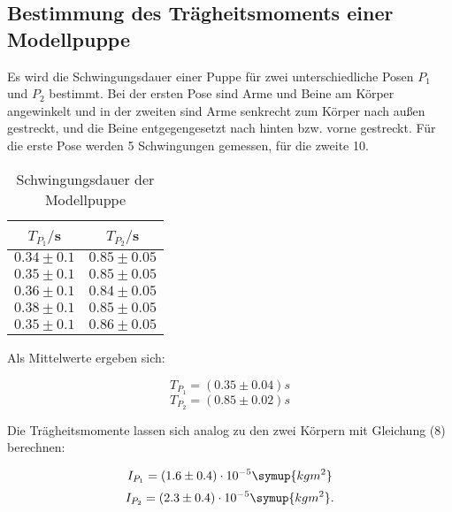 \subsection{Bestimmung des Trägheitsmoments einer Modellpuppe}
Es wird die Schwingungsdauer einer Puppe für zwei unterschiedliche 
Posen $P_\text{1}$ und $P_\text{2}$ bestimmt. Bei der ersten Pose sind Arme und Beine am Körper angewinkelt und in der zweiten
sind Arme senkrecht zum Körper nach außen gestreckt, und die Beine entgegengesetzt nach hinten bzw. vorne gestreckt.
Für die erste Pose werden 5 Schwingungen gemessen, für die zweite 10.
\begin{table}[H]
  \centering
  \caption{Schwingungsdauer der Modellpuppe}
  \label{tab:Schwingungsdauer der Modellpuppe}
  \begin{tabular}{c c}
    \toprule
    $T_{P_1}/$s & $T_{P_2}/$s \\
    \midrule
    $0.34 \pm 0.1$ & $0.85 \pm 0.05$ \\
    $0.35 \pm 0.1$ & $0.85 \pm 0.05$ \\
    $0.36 \pm 0.1$ & $0.84 \pm 0.05$ \\
    $0.38 \pm 0.1$ & $0.85 \pm 0.05$ \\
    $0.35 \pm 0.1$ & $0.86 \pm 0.05$ \\
    \bottomrule
  \end{tabular}
\end{table}

Als Mittelwerte ergeben sich:

\begin{equation}
T_{P_1} = (0.35 \pm 0.04) s
\end{equation}
\begin{equation}
T_{P_2}= (0.85 \pm 0.02) s
\end{equation}

Die Trägheitsmomente lassen sich analog zu den zwei Körpern mit Gleichung (8) berechnen:

\begin{equation}
I_{P_1}  = (1.6 \pm 0.4)\cdot 10^{-5} \symup{kgm^2} 
\end{equation}
\begin{equation}
I_{P_2}  = (2.3 \pm 0.4)\cdot 10^{-5} \symup{kgm^2} .
\end{equation}




